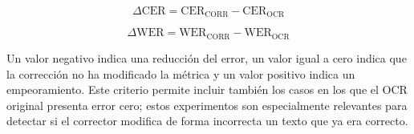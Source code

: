 \begin{equation}
	\Delta\mathrm{CER}=\mathrm{CER}_{\mathrm{CORR}}-\mathrm{CER}_{\mathrm{OCR}}
\end{equation}

\begin{equation}
	\Delta\mathrm{WER}=\mathrm{WER}_{\mathrm{CORR}}-\mathrm{WER}_{\mathrm{OCR}}
\end{equation}

Un valor negativo indica una reducción del error, un valor igual a cero indica que la corrección no ha modificado la métrica y un valor positivo indica un empeoramiento. Este criterio permite incluir también los casos en los que el OCR original presenta error cero; estos experimentos son especialmente relevantes para detectar si el corrector modifica de forma incorrecta un texto que ya era correcto.

